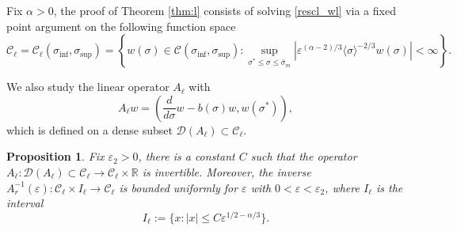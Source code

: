 \documentclass[letterpaper,11pt]{article}
\newcommand{\eps}{\varepsilon}
\numberwithin{equation}{section}
\theoremstyle{plain}
\newtheorem{Proposition}[Lemma]{Proposition}
\begin{document}
Fix $\alpha>0$, the proof of Theorem \ref{thm:l} consists of solving \eqref{rescl_wl} via a fixed point argument on the following function space
\[
\mathcal{C}_\ell=\mathcal{C}_{\ell}(\sigma_{\inf}, \sigma_{\sup}) = \left\{ w(\sigma) \in \mathcal{C}(\sigma_{\inf}, \sigma_{\sup}): \sup_{\sigma^*\le \sigma \le\bar{\sigma}_m} |\eps^{(\alpha-2)/3}\langle\sigma \rangle^{-2/3} w(\sigma)|<\infty \right\}.
\]


We also study the linear operator $A_\ell$ with
\[
A_\ell w = \left(\frac{d}{d\sigma}w - b(\sigma)w, w(\sigma^*)\right),
\] 
which is defined on a dense subset $\mathcal{D}(A_\ell) \subset \mathcal{C}_\ell$.

\begin{Proposition} \label{inv_A_l} Fix $\eps_2 >0$, there is a constant $C$ such that the operator $A_\ell : \mathcal{D}(A_\ell)\subset \mathcal{C}_\ell \to \mathcal{C}_\ell\times \mathbb{R}$ is invertible. Moreover, the inverse $A_r^{-1}(\eps) : \mathcal{C}_\ell \times I_\ell \to \mathcal{C}_\ell$ is bounded uniformly for $\eps$ with $0<\eps <\eps_2$, where $I_\ell$ is the interval
\[
I_\ell :=\{x : |x|\le C\eps^{1/2-\alpha/3}\}.
\]
\end{Proposition}
\end{document}
